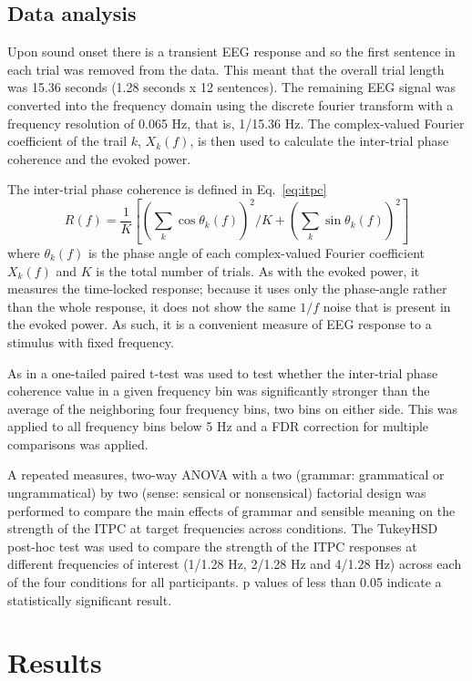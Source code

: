 \documentclass[a4paper,10pt,twoside]{article}
\begin{document}
\subsection*{Data analysis}

Upon sound onset there is a transient EEG response and
so the first sentence in each trial was removed from the data. This
meant that the overall trial length was 15.36 seconds (1.28 seconds x
12 sentences). The remaining EEG signal was converted into the frequency domain using the discrete
fourier transform with a frequency resolution of 0.065 Hz, that is, 1/15.36 Hz. The complex-valued Fourier coefficient of the trail $k$, $X_k(f)$, is then used to calculate the inter-trial phase coherence and the evoked power. 

The inter-trial phase coherence is defined in Eq.~\ref{eq:itpc}
\begin{equation}
\label{eq:itpc}
R(f)=\frac{1}{K}\left[\left(\sum_k{\cos{\theta_k(f)}}\right)^2/K+\left(\sum_k{\sin{\theta_k(f)}}\right)^2\right]
\end{equation}
where $\theta_k(f)$ is the phase angle of each complex-valued Fourier coefficient $X_k(f)$ and $K$ is the total number of trials. As with the evoked power, it measures the time-locked response; because it uses only the phase-angle rather than the whole response, it does not show the same $1/f$ noise that is present in the evoked power. As such, it is a convenient measure of EEG response to a stimulus with fixed frequency.

As in \cite{DingEtAl2016} a one-tailed paired t-test was used to test whether the inter-trial phase coherence value in a given frequency bin was significantly stronger than the average of the neighboring four frequency bins, two bins on either side. This was applied to all frequency bins below 5 Hz and a FDR correction for multiple comparisons was applied. 

A repeated measures, two-way ANOVA with a two (grammar: grammatical or ungrammatical) by two (sense: sensical or nonsensical) factorial design was performed to compare the main effects of grammar and sensible meaning on the strength of the ITPC at target frequencies across conditions. The TukeyHSD post-hoc test was used to compare the strength of the ITPC responses at different frequencies of interest (1/1.28 Hz, 2/1.28 Hz and 4/1.28 Hz) across each of the four conditions for all participants. p values of less than 0.05 indicate a statistically significant result.


\section*{Results}
\end{document}
